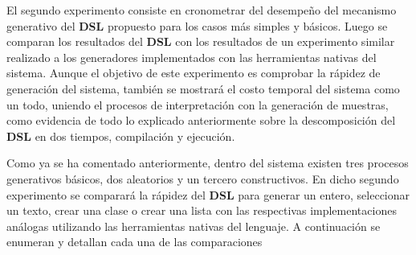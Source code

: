 El segundo experimento consiste en cronometrar del desempeño del mecanismo generativo del {\bf DSL} propuesto para los casos más simples y
básicos. Luego se comparan los resultados del {\bf DSL} con los resultados de un experimento similar realizado a los generadores implementados
con las herramientas nativas del sistema. Aunque el objetivo de este experimento es comprobar la rápidez de generación del sistema,
también se mostrará el costo temporal del sistema como un todo, uniendo el procesos de interpretación con la generación de muestras,
como evidencia de todo lo explicado anteriormente sobre la descomposición del {\bf DSL} en dos tiempos, compilación y ejecución.

Como ya se ha comentado anteriormente, dentro del sistema existen tres procesos generativos básicos, dos aleatorios y un tercero
constructivos. En dicho segundo experimento se comparará la rápidez del {\bf DSL} para generar un entero, seleccionar un texto, crear una
clase o crear una lista con las respectivas implementaciones análogas utilizando las herramientas nativas del lenguaje. A continuación
se enumeran y detallan cada una de las comparaciones
